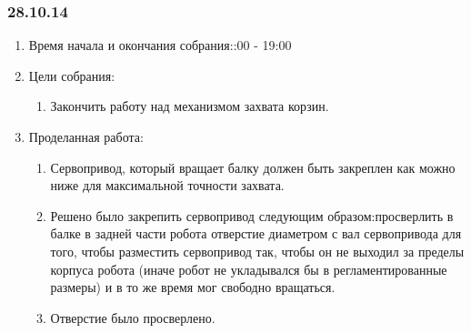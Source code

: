 
\subsubsection{28.10.14}

\begin{enumerate}
	\item Время начала и окончания собрания::00 - 19:00
	\item Цели собрания:\newline
	\begin{enumerate}
	  \item Закончить работу над механизмом захвата корзин.\newline
	  
    \end{enumerate}
    
	\item Проделанная работа:\newline
	\begin{enumerate}
	  \item Сервопривод, который вращает балку должен быть закреплен как можно ниже для максимальной точности захвата.\newline
      
      \item Решено было закрепить сервопривод следующим образом:просверлить в балке в задней части робота отверстие диаметром с вал сервопривода для того, чтобы разместить сервопривод так, чтобы он не выходил за пределы корпуса робота (иначе робот не укладывался бы в регламентированные размеры) и в то же время мог свободно вращаться.\newline
      
      \item Отверстие было просверлено.\newline
      

\end{enumerate}
\end{enumerate}
